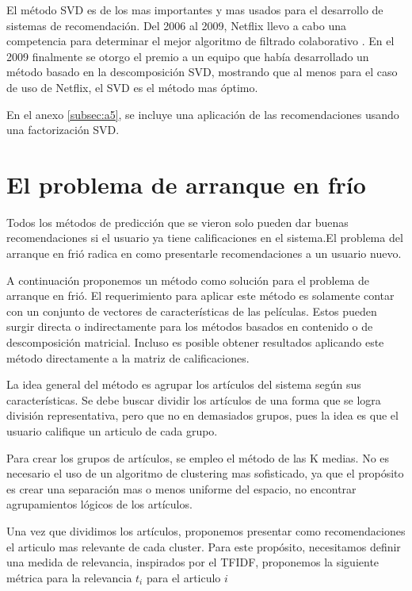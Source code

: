 \documentclass[11pt]{article}
\begin{document}
El método SVD es de los mas importantes y mas usados para el desarrollo de
sistemas de recomendación. Del 2006 al 2009, Netflix llevo a cabo una
competencia para determinar el mejor algoritmo de filtrado colaborativo
\cite{svd}. En el 2009 finalmente se otorgo el premio a un equipo que había
desarrollado un método basado en la descomposición SVD, mostrando que al menos
para el caso de uso de Netflix, el SVD es el método mas óptimo.

En el anexo \ref{subsec:a5}, se incluye una aplicación de las recomendaciones
usando una factorización SVD.

\section{El problema de arranque en frío}
\label{clustering}

Todos los métodos de predicción que se vieron solo pueden dar buenas
recomendaciones si el usuario ya tiene calificaciones en el sistema.El problema
del arranque en frió radica en como presentarle recomendaciones a un usuario
nuevo.

A continuación proponemos un método como solución para el problema de arranque
en frió. El requerimiento para aplicar este método es solamente contar con
un conjunto de vectores de características de las películas. Estos pueden
surgir directa o indirectamente para los métodos basados en contenido o de
descomposición matricial. Incluso es posible obtener resultados aplicando este
método directamente a la matriz de calificaciones.

La idea general del método es agrupar los artículos del sistema según sus
características. Se debe buscar dividir los artículos de una forma que se logra
división representativa, pero que no en demasiados grupos, pues la idea es que
el usuario califique un articulo de cada grupo.

Para crear los grupos de artículos, se empleo el método de las K medias. No es
necesario el uso de un algoritmo de clustering mas sofisticado, ya que el
propósito es crear una separación mas o menos uniforme del espacio, no
encontrar agrupamientos lógicos de los artículos.

Una vez que dividimos los artículos, proponemos presentar como recomendaciones
el articulo mas relevante de cada cluster. Para este propósito, necesitamos
definir una medida de relevancia, inspirados por el TFIDF, proponemos la
siguiente métrica para la relevancia $t_i$ para el articulo $i$
\end{document}
